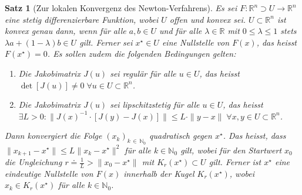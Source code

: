 \documentclass[a4paper,12pt]{article}
\numberwithin{equation}{section}
\newtheorem{theorem}{Satz}
\begin{document}
\begin{theorem}[Zur lokalen Konvergenz des Newton-Verfahrens]\label{thm:lokkonvnewton}
Es sei $F:\mathbb{R}^n \supset U \rightarrow \mathbb{R}^n$ eine stetig differenzierbare Funktion, wobei $U$ offen und konvex sei. $U \subset \mathbb{R}^n$ ist konvex genau dann, wenn für alle $a,b \in U$ und für alle $\lambda \in \mathbb{R}$ mit $0 \leq \lambda \leq 1$ stets $\lambda a + (1-\lambda) b \in U$ gilt. Ferner sei $x^\star \in U$ eine Nullstelle von $F(x)$, das heisst $F(x^\star) = 0$. Es sollen zudem die folgenden Bedingungen gelten:
\begin{enumerate}
\item \label{bed1newtonkonv} Die Jakobimatrix $J(u)$ sei regulär für alle $u \in U$, das heisst $\det[J(u)] \neq 0 \; \forall u \in U \subset \mathbb{R}^n$.
\item \label{bed2newtonkonv} Die Jakobimatrix $J(u)$ sei lipschitzstetig für alle $u \in U$, das heisst $\exists L > 0 : \|J(x)^{-1}\cdot [J(y)-J(x)]\| \leq L\cdot \|y-x\|\; \forall x,y \in U \subset \mathbb{R}^n$.
\end{enumerate}
Dann konvergiert die Folge $(x_k)_{k \, \in \, \mathbb{N}_0}$ quadratisch gegen $x^\star$. Das heisst, dass $\| x_{k+1}-x^\star \| \leq L\|x_k-x^\star\|^2$ für alle $k \in \mathbb{N}_0$ gilt, wobei für den Startwert $x_0$ die Ungleichung $r\doteq \frac{1}{L} > \|x_0-x^\star\|$ mit $K_r(x^\star) \subset U$ gilt. Ferner ist $x^\star$ eine eindeutige Nullstelle von $F(x)$ innerhalb der Kugel $K_r(x^\star)$, wobei $x_k \in K_r(x^\star)$ für alle $k\in \mathbb{N}_0$.
\end{theorem}
\end{document}
